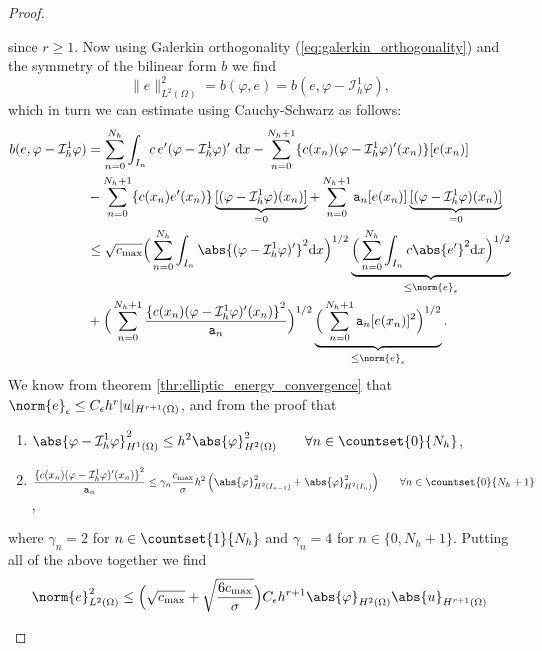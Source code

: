 \begin{proof}
\begin{proofstep}
		since $r \geq 1$. 
		Now using Galerkin orthogonality (\ref{eq:galerkin_orthogonality}) and the symmetry of the bilinear form $b$ we find
		\begin{equation}
			\| e \|_{L^2(\Omega)}^2 = b(\varphi, e) = b(e, \varphi - \mathcal{I}_h^1 \varphi) \nonumber,
		\end{equation}
		which in turn we can estimate using Cauchy-Schwarz as follows:
		\begin{align*}
			b(e, \varphi - \mathcal{I}_h^1 \varphi) 
			& = \sum_{n=0}^{N_h} \int_{I_n} c \, e' (\varphi - \mathcal{I}_h^1 \varphi)' \text{ d}x 
			- \sum_{n=0}^{N_h + 1} \{ c(x_n) (\varphi - \mathcal{I}_h^1 \varphi)'(x_n) \}[e(x_n)] \\
			&- \sum_{n=0}^{N_h + 1} \{ c(x_n) e'(x_n)\}\underbrace{[(\varphi - \mathcal{I}_h^1 \varphi)(x_n)]}_{=0} 
			+ \sum_{n=0}^{N_h + 1} \texttt{a}_n [e(x_n)]\underbrace{[(\varphi - \mathcal{I}_h^1 \varphi)(x_n)]}_{=0} \\
			& \leq \sqrt{c_{\max}} \Big(\sum_{n=0}^{N_h} \int_{I_n}  \abs{(\varphi - \mathcal{I}_h^1 \varphi)'}^2 \text{d}x \Big)^{1/2}
			\underbrace{\Big(\sum_{n=0}^{N_h} \int_{I_n} c \abs{e'}^2 \text{d}x \Big)^{1/2}}_{\leq \norm{e}_{\epsilon}} \\
			&+ \Big(\sum_{n=0}^{N_h + 1} \frac{{\{ c(x_n) (\varphi - \mathcal{I}_h^1 \varphi)'(x_n) \}}^2}{\texttt{a}_n} \Big)^{1/2} 
			\underbrace{\Big(\sum_{n=0}^{N_h + 1} \texttt{a}_n [e(x_n)]^2 \Big)^{1/2}}_{\leq \norm{e}_{\epsilon}}.
		\end{align*}
		We know from theorem \ref{thr:elliptic_energy_convergence} that $\norm{e}_{\epsilon} \leq C_{\epsilon} h^r |u|_{H^{r+1}(\Omega)}$,
		and from the proof that 
		\begin{enumerate}
			\item $ \displaystyle \abs{\varphi - \mathcal{I}_h^1 \varphi}_{H^1(\Omega)}^2 \leq h^2 \abs{\varphi}_{H^2(\Omega)}^2 \qquad \forall n \in \countset{0}{N_h} $,
			\item $\displaystyle \frac{{\{ c(x_n) (\varphi - \mathcal{I}_h^1 \varphi)'(x_n) \}}^2}{\texttt{a}_n} 
				\leq \gamma_n \frac{c_{\max}}{\sigma} h^2 \, \Big( \abs{\varphi}_{H^2(I_{n-1})}^2 + \abs{\varphi}_{H^2(I_{n})}^2 \Big) \qquad \forall n \in \countset{0}{N_h+1}$,
		\end{enumerate}
		where $\gamma_n = 2$ for $n \in \countset{1}{N_h}$ and $\gamma_n = 4$ for $n \in \{0, N_h+ 1\}$. Putting all of the above together we find
		\begin{equation*}
			\norm{e}_{L^2(\Omega)}^2 \leq \Big( \sqrt{c_{\max}} + \sqrt{\frac{6 c_{\max}}{\sigma}} \Big) C_{\epsilon} h^{r+1} \abs{\varphi}_{H^2(\Omega)} \abs{u}_{H^{r+1}(\Omega)}

\end{equation*}
\end{proofstep}
\end{proof}
